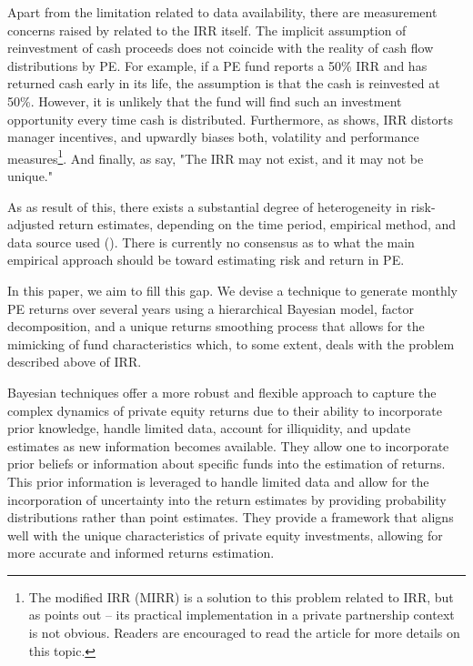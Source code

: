 \documentclass[11pt]{article}
\begin{document}
Apart from the limitation related to data availability, there are measurement concerns raised by \cite{Gottschalg2007} related to the IRR itself. The implicit assumption of reinvestment of cash proceeds does not coincide with the reality of cash flow distributions by PE. For example, if a PE fund reports a 50\% IRR and has returned cash early in its life, the assumption is that the cash is reinvested at 50\%. However, it is unlikely that the fund will find such an investment opportunity every time cash is distributed. Furthermore, as \cite{Phalippou2008} shows, IRR distorts manager incentives, and upwardly biases both, volatility and performance measures\footnote{The modified IRR (MIRR) is a solution to this problem related to IRR, but as \cite{Phalippou2008} points out -- its practical implementation in a private partnership context is not obvious. Readers are encouraged to read the article for more details on this topic.}. And finally, as \cite{Sorensen2013} say, "The IRR may not exist, and it may not be unique."

As as result of this, there exists a substantial degree of heterogeneity in risk-adjusted return estimates, depending on the time period, empirical method, and data source used (\cite{Korteweg2019}). There is currently no consensus as to what the main empirical approach should be toward estimating risk and return in PE.

In this paper, we aim to fill this gap. We devise a technique to generate monthly PE returns over several years using a hierarchical Bayesian model, factor decomposition, and a unique returns smoothing process that allows for the mimicking of fund characteristics which, to some extent, deals with the problem described above of IRR. 

Bayesian techniques offer a more robust and flexible approach to capture the complex dynamics of private equity returns due to their ability to incorporate prior knowledge, handle limited data, account for illiquidity, and update estimates as new information becomes available. They allow one to incorporate prior beliefs or information about specific funds into the estimation of returns. This prior information is leveraged to handle limited data and allow for the incorporation of uncertainty into the return estimates by providing probability distributions rather than point estimates. They provide a framework that aligns well with the unique characteristics of private equity investments, allowing for more accurate and informed returns estimation.
\end{document}

